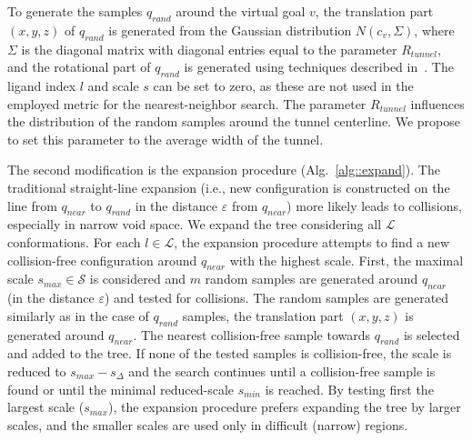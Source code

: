 \documentclass[usletter, 10pt, conference]{ieeeconf} %
\def\qrand{q_{rand}}
\def\qnear{q_{near}}
\def\rv{R_{tunnel}}
\def\smin{s_{min}}
\def\smax{s_{max}}
\def\sdelta{s_{\Delta}}
\def\L{\mathcal{L}}
\def\S{\mathcal{S}}
\begin{document}
To generate the samples $\qrand$ around the virtual goal $v$, the translation part $(x,y,z)$ of $\qrand$ is generated
from the Gaussian distribution $N(c_v,\Sigma)$, where $\Sigma$ is the diagonal matrix with diagonal entries equal to the parameter $\rv$, 
and the rotational part of $\qrand$ is generated using techniques described in~\cite{kuffnerES}.
The ligand index $l$ and scale $s$ can be set to zero, as these are not used in the employed metric for the nearest-neighbor search.
The parameter $\rv$ influences the distribution of the random samples around the tunnel centerline. 
We propose to set this parameter to the average width of the tunnel.




The second modification is the expansion procedure (Alg.~\ref{alg::expand}). %
The traditional straight-line expansion (i.e., new configuration is constructed on the line from $\qnear$ to $\qrand$ in the distance
$\varepsilon$ from $\qnear$) more likely leads to collisions, especially in narrow void space.
We expand the tree considering all $\L$ conformations.
For each $l \in \L$, the expansion procedure attempts to find a new collision-free configuration around $\qnear$ with the highest scale.
First, the maximal scale $\smax \in \S$ is considered and $m$ random samples are generated around $\qnear$ (in the distance $\varepsilon$) 
and tested for collisions.
The random samples are generated similarly as in the case of $\qrand$ samples, the translation part $(x,y,z)$ is generated around $\qnear$.
The nearest collision-free sample towards $\qrand$ is selected and added to the tree.
If none of the tested samples is collision-free, the scale is reduced to $\smax-\sdelta$ and the search continues
until a collision-free sample is found or until the minimal reduced-scale $\smin$ is reached.
By testing first the largest scale ($\smax$), the expansion procedure prefers expanding the tree by larger scales, and the
smaller scales are used only in difficult (narrow) regions.
\end{document}
